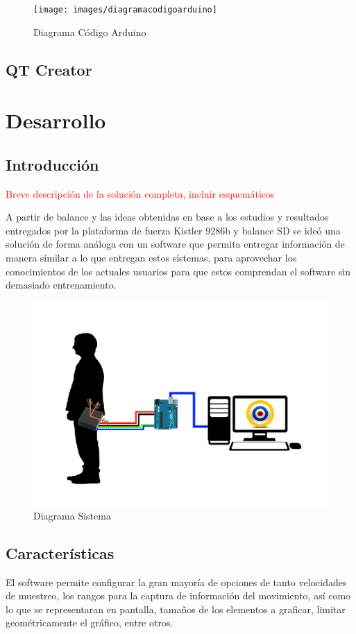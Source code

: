\documentclass[12pt,a4paper]{article}
\begin{document}
  \begin{figure}[H]
  \centering
      \texttt{[image: images/diagramacodigoarduino]}
      \caption{Diagrama Código Arduino}
      \label{fig:arduinocode}
  \end{figure}

\subsection{QT Creator}

\section{Desarrollo}
\subsection{Introducción}
\textcolor{red}{ Breve descripción de la solución completa, incluir esquemáticos}

A partir de balance y las ideas obtenidas en base a los estudios y resultados entregados por la plataforma de fuerza Kistler 9286b y balance SD se ideó una solución de forma análoga con un software que permita entregar información de manera similar a lo que entregan estos sistemas, para aprovechar los conocimientos de los actuales usuarios para que estos comprendan el software sin demasiado entrenamiento.

\begin{figure}[H]
\centering
\includegraphics[scale=0.3]{images/diagrama_sistema}
\caption{Diagrama Sistema}
\label{fig:diagramasistema}
\end{figure}

\subsection{Características}
El software permite configurar la gran mayoría de opciones de tanto velocidades de muestreo, los rangos para la captura de información del movimiento, así como lo que se representaran en pantalla, tamaños de los elementos a graficar, limitar geométricamente el gráfico, entre otros.
\end{document}

